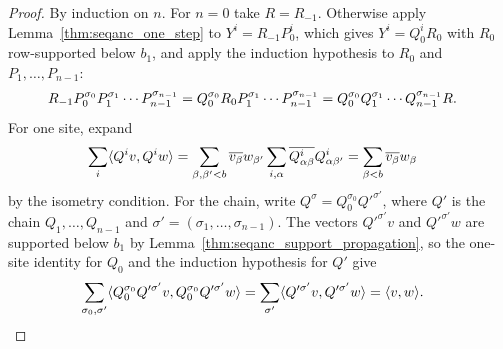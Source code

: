 \begin{proof}
    \leanok
    By induction on $n$. For $n=0$ take $R=R_{-1}$. Otherwise apply
    Lemma~\ref{thm:seqanc_one_step} to $Y^i=R_{-1}P_0^i$, which gives
    $Y^i=Q_0^iR_0$ with $R_0$ row-supported below $b_1$, and apply the
    induction hypothesis to $R_0$ and $P_1,\dots,P_{n-1}$:
    \begin{align}
        R_{-1}P_0^{\sigma_0}P_1^{\sigma_1}\cdots P_{n-1}^{\sigma_{n-1}}
         & =Q_0^{\sigma_0}R_0P_1^{\sigma_1}\cdots P_{n-1}^{\sigma_{n-1}}
        =Q_0^{\sigma_0}Q_1^{\sigma_1}\cdots Q_{n-1}^{\sigma_{n-1}}R.
        \notag
    \end{align}
    For one site, expand
    \begin{align}
        \sum_i\langle Q^iv,Q^iw\rangle
         & =\sum_{\beta,\beta'<b}\overline{v_\beta}w_{\beta'}
        \sum_{i,\alpha}\overline{Q^i_{\alpha\beta}}Q^i_{\alpha\beta'}
        =\sum_{\beta<b}\overline{v_\beta}w_\beta
        \notag
    \end{align}
    by the isometry condition. For the chain, write
    $Q^{\sigma}=Q_0^{\sigma_0}Q'^{\sigma'}$, where $Q'$ is the chain
    $Q_1,\dots,Q_{n-1}$ and $\sigma'=(\sigma_1,\dots,\sigma_{n-1})$. The
    vectors $Q'^{\sigma'}v$ and $Q'^{\sigma'}w$ are supported below $b_1$ by
    Lemma~\ref{thm:seqanc_support_propagation}, so the one-site identity for
    $Q_0$ and the induction hypothesis for $Q'$ give
    \begin{align}
        \sum_{\sigma_0,\sigma'}
        \langle Q_0^{\sigma_0}Q'^{\sigma'}v,Q_0^{\sigma_0}Q'^{\sigma'}w\rangle
         & =\sum_{\sigma'}\langle Q'^{\sigma'}v,Q'^{\sigma'}w\rangle
        =\langle v,w\rangle.
        \notag
    \end{align}
\end{proof}

